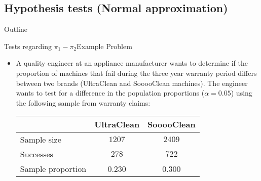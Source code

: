\documentclass[xcolor=dvipsnames]{beamer}
\begin{document}
\subsection{Hypothesis tests (Normal approximation)}

\begin{frame}{Outline}
	\tableofcontents[currentsection,subsectionstyle=show/shaded/hide]
\end{frame}

\begin{frame}{Tests regarding $\pi_1 - \pi_2$}{Example Problem}
	\begin{itemize}
		\item A quality engineer at an appliance manufacturer wants to determine if the proportion of machines that fail during the three year warranty period differs between two brands (UltraClean and SooooClean machines). The engineer wants to test for a difference in the population proportions ($\alpha = 0.05$) using the following sample from warranty claims: 
		\vspace{3mm}
		\begin{center}
			\begin{tabular}{lcc}
				\hline
				& UltraClean & SooooClean \\ \hline
				Sample size & $1207$ & $2409$ \\
				Successes & $278$ & $722$ \\
				Sample proportion & 0.230 & 0.300 \\ \hline
			\end{tabular}
		\end{center}
	\end{itemize}
\end{frame}
\end{document}
